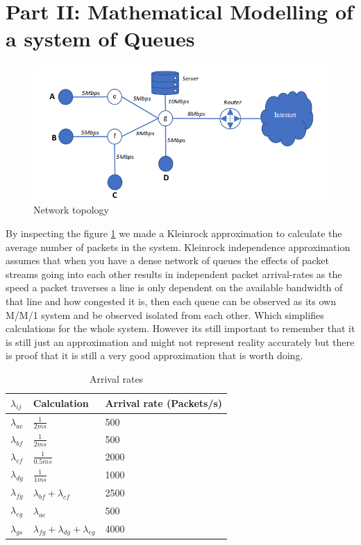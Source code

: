 \documentclass{article}
\begin{document}
\section{Part II: Mathematical Modelling of a system of Queues} \label{part2}
\begin{figure}[h!]
  \includegraphics[width=\linewidth]{netmap.png}
  \caption{Network topology}
  \label{fig:netmap}
\end{figure}
By inspecting the figure \ref{fig:netmap} we made a Kleinrock approximation to calculate the average number of 
packets in the system. Kleinrock independence approximation assumes that when you have a dense network of queues
the effects of packet streams going into each other results in independent packet arrival-rates as the speed a packet traverses a line is only dependent on the available bandwidth of that line and how congested it is, then each
queue can be observed as its own M/M/1 system and be observed isolated from each other. Which simplifies calculations
for the whole system. However its still important to remember that it is still just an approximation and might not
represent reality accurately but there is proof that it is still a very good approximation that is worth doing. \cite{kenyon2002high}
\begin{table}[h]
\centering
\label{Arrivalrates}
\caption{Arrival rates}
\begin{tabular}{|l|l|l|}
\hline
$\lambda_{ij}$ & Calculation & Arrival rate (Packets/s) \\ \hline
$\lambda_{ae}$ & $\frac{1}{2ms}$  & 500 \\ \hline
$\lambda_{bf}$ & $\frac{1}{2ms}$  & 500 \\ \hline
$\lambda_{cf}$ & $\frac{1}{0.5ms}$  & 2000 \\ \hline
$\lambda_{dg}$ & $\frac{1}{1ms}$  & 1000 \\ \hline
$\lambda_{fg}$ & $\lambda_{bf} + \lambda_{cf}$  & 2500  \\ \hline
$\lambda_{eg}$ & $\lambda_{ae}$ & 500 \\ \hline
$\lambda_{gs}$ & $\lambda_{fg} + \lambda_{dg} + \lambda_{eg}$ & 4000 \\ \hline
\end{tabular}
\end{table}
\end{document}
